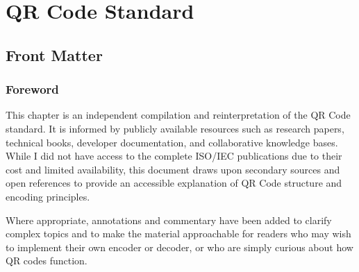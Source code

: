 \documentclass[../../2_codex]{subfiles}
\begin{document}
\chapter{QR Code Standard}

\section{Front Matter}

\subsection{Foreword}




This chapter is an independent compilation and reinterpretation of the QR Code standard. 
It is informed by publicly available resources such as research papers, technical books, developer documentation, and collaborative knowledge bases. 
While I did not have access to the complete ISO/IEC publications due to their cost and limited availability, this document draws upon secondary sources and open references to provide an accessible explanation of QR Code structure and encoding principles.  

Where appropriate, annotations and commentary have been added to clarify complex topics and to make the material approachable for readers who may wish to implement their own encoder or decoder, or who are simply curious about how QR codes function.  
\end{document}
